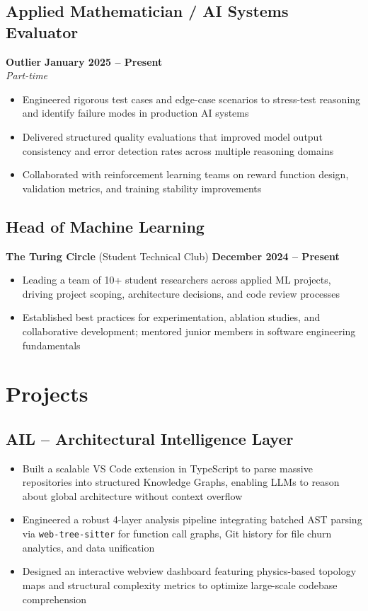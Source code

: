 \documentclass[a4paper,11pt]{article}
\begin{document}
\subsection{Applied Mathematician / AI Systems Evaluator}
\textbf{Outlier} \hfill \textbf{January 2025 -- Present} \\
\textit{Part-time}
\begin{itemize}[leftmargin=15pt, itemsep=1pt]
    \item Engineered rigorous test cases and edge-case scenarios to stress-test reasoning and identify failure modes in production AI systems
    \item Delivered structured quality evaluations that improved model output consistency and error detection rates across multiple reasoning domains
    \item Collaborated with reinforcement learning teams on reward function design, validation metrics, and training stability improvements
\end{itemize}

\subsection{Head of Machine Learning}
\textbf{The Turing Circle} (Student Technical Club) \hfill \textbf{December 2024 -- Present}
\begin{itemize}[leftmargin=15pt, itemsep=1pt]
    \item Leading a team of 10+ student researchers across applied ML projects, driving project scoping, architecture decisions, and code review processes
    \item Established best practices for experimentation, ablation studies, and collaborative development; mentored junior members in software engineering fundamentals
\end{itemize}

\section{Projects}

\subsection{AIL -- Architectural Intelligence Layer}
\begin{itemize}[leftmargin=15pt, itemsep=1pt]
    \item Built a scalable VS Code extension in TypeScript to parse massive repositories into structured Knowledge Graphs, enabling LLMs to reason about global architecture without context overflow
    \item Engineered a robust 4-layer analysis pipeline integrating batched AST parsing via \texttt{web-tree-sitter} for function call graphs, Git history for file churn analytics, and data unification
    \item Designed an interactive webview dashboard featuring physics-based topology maps and structural complexity metrics to optimize large-scale codebase comprehension
\end{itemize}
\end{document}
